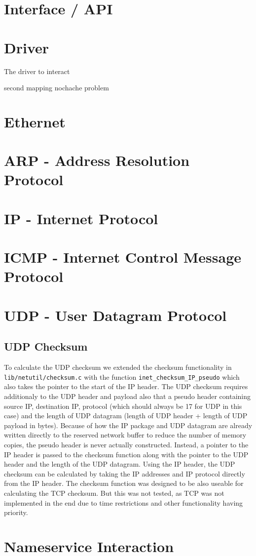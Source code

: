 \section{Interface / API}

\section{Driver}

The driver to interact

second mapping
nochache problem

\section{Ethernet}

\section{ARP - Address Resolution Protocol}

\section{IP - Internet Protocol}

\section{ICMP - Internet Control Message Protocol}

\section{UDP - User Datagram Protocol}

\subsection{UDP Checksum}

To calculate the UDP checksum we extended the checksum functionality in \verb|lib/netutil/checksum.c| with the function \verb|inet_checksum_IP_pseudo| which also takes the pointer to the start of the IP header. The UDP checksum requires additionaly to the UDP header and payload also that a pseudo header containing source IP, destination IP, protocol (which should always be 17 for UDP in this case) and the length of UDP datagram (length of UDP header + length of UDP payload in bytes).
Because of how the IP package and UDP datagram are already written directly to the reserved network buffer to reduce the number of memory copies, the pseudo header is never actually constructed. Instead, a pointer to the IP header is passed to the checksum function along with the pointer to the UDP header and the length of the UDP datagram. Using the IP header, the UDP checksum can be calculated by taking the IP addresses and IP protocol directly from the IP header.
The checksum function was designed to be also useable for calculating the TCP checksum. But this was not tested, as TCP was not implemented in the end due to time restrictions and other functionality having priority.

\section{Nameservice Interaction}